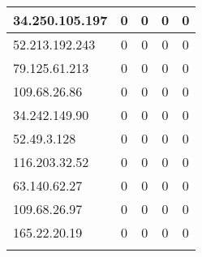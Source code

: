 \documentclass{article}
\begin{document}
\begin{longtable}{|>{\raggedright\arraybackslash}p{3cm}|c|c|c|c|}
    
    \rowcolor{lightgreen} %
    
    34.250.105.197 & 0 & 0 & 0 & 0 \\
    \hline
    
    
    \rowcolor{lightgreen} %
    
    52.213.192.243 & 0 & 0 & 0 & 0 \\
    \hline
    
    
    \rowcolor{lightgreen} %
    
    79.125.61.213 & 0 & 0 & 0 & 0 \\
    \hline
    
    
    \rowcolor{lightgreen} %
    
    109.68.26.86 & 0 & 0 & 0 & 0 \\
    \hline
    
    
    \rowcolor{lightgreen} %
    
    34.242.149.90 & 0 & 0 & 0 & 0 \\
    \hline
    
    
    \rowcolor{lightgreen} %
    
    52.49.3.128 & 0 & 0 & 0 & 0 \\
    \hline
    
    
    \rowcolor{lightgreen} %
    
    116.203.32.52 & 0 & 0 & 0 & 0 \\
    \hline
    
    
    \rowcolor{lightgreen} %
    
    63.140.62.27 & 0 & 0 & 0 & 0 \\
    \hline
    
    
    \rowcolor{lightgreen} %
    
    109.68.26.97 & 0 & 0 & 0 & 0 \\
    \hline
    
    
    \rowcolor{lightgreen} %
    
    165.22.20.19 & 0 & 0 & 0 & 0 \\
    \hline
    
    
    \rowcolor{lightgreen} %
    

\end{longtable}
\end{document}
